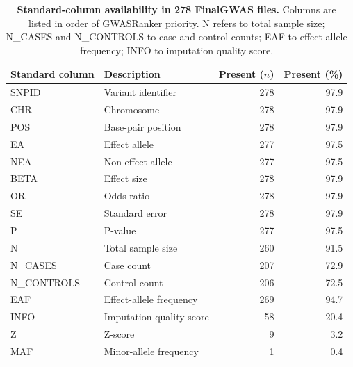 \documentclass[11pt,a4paper]{article}
\begin{document}
\begin{table}[H]
\centering
\caption{\textbf{Standard-column availability in 278 FinalGWAS files.} Columns are listed in order of GWASRanker priority. N refers to total sample size; N\_CASES and N\_CONTROLS to case and control counts; EAF to effect-allele frequency; INFO to imputation quality score.}
\label{tab}
\small
\begin{tabular}{llrr}
\toprule
\textbf{Standard column} & \textbf{Description} & \textbf{Present ($n$)} & \textbf{Present (\%)} \\
\midrule
SNPID       & Variant identifier          & 278 & 97.9 \\
CHR         & Chromosome                  & 278 & 97.9 \\
POS         & Base-pair position          & 278 & 97.9 \\
EA          & Effect allele               & 277 & 97.5 \\
NEA         & Non-effect allele           & 277 & 97.5 \\
BETA        & Effect size                 & 278 & 97.9 \\
OR          & Odds ratio                  & 278 & 97.9 \\
SE          & Standard error              & 278 & 97.9 \\
P           & P-value                     & 277 & 97.5 \\
N           & Total sample size           & 260 & 91.5 \\
N\_CASES    & Case count                  & 207 & 72.9 \\
N\_CONTROLS & Control count               & 206 & 72.5 \\
EAF         & Effect-allele frequency     & 269 & 94.7 \\
INFO        & Imputation quality score    &  58 & 20.4 \\
Z           & Z-score                     &   9 &  3.2 \\
MAF         & Minor-allele frequency      &   1 &  0.4 \\
\bottomrule
\end{tabular}
\end{table}
\end{document}
